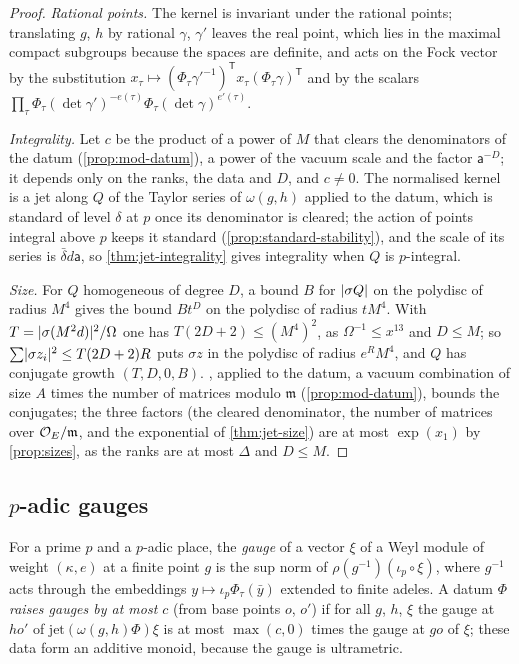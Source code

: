 \begin{proof}
\emph{Rational points.} The kernel is invariant under the rational points; translating $g$, $h$ by rational $\gamma$, $\gamma'$ leaves the real point, which lies in the maximal compact subgroups because the spaces are definite, and acts on the Fock vector by the substitution $x_\tau\mapsto(\Phi_\tau\gamma'^{-1})^{\mathsf T}x_\tau(\Phi_\tau\gamma)^{\mathsf T}$ and by
the scalars $\prod_\tau\Phi_\tau(\det\gamma')^{-e(\tau)}\Phi_\tau(\det\gamma)^{e'(\tau)}$.

\emph{Integrality.} Let $c$ be the product of a power of $M$ that clears the denominators of the datum (\cref{prop:mod-datum}), a power of the vacuum scale and the factor $\mathsf a^{-D}$; it depends only on the ranks, the data and $D$, and $c\ne0$. The normalised kernel is a jet along $Q$ of the Taylor series of $\omega(g,h)$ applied to the
datum, which is standard of level $\delta$ at $p$ once its denominator is cleared; the action of points integral above $p$ keeps it standard (\cref{prop:standard-stability}), and the scale of its series is $\bar\delta d\mathsf a$, so \cref{thm:jet-integrality} gives integrality when $Q$ is $p$-integral.

\emph{Size.} For $Q$ homogeneous of degree $D$, a bound $B$ for $\lvert \sigma Q\rvert$ on the polydisc of radius $M^4$ gives the bound $Bt^D$ on the polydisc of radius $tM^4$. With $T=\lvert \sigma(M^2d)\rvert^2/\Omega$ one has $T(2D+2)\le(M^4)^2$, as $\Omega^{-1}\le x^{13}$ and $D\le M$; so $\sum\lvert \sigma z_i\rvert^2\le T(2D+2)R$ puts $\sigma z$ in the polydisc of
radius $e^RM^4$, and $Q$ has conjugate growth $(T,D,0,B)$. , applied to the datum, a vacuum combination of size $A$ times the number of matrices modulo $\mathfrak m$ (\cref{prop:mod-datum}), bounds the conjugates; the three factors (the cleared denominator, the number of matrices over $\mathcal{O}_E/\mathfrak m$, and the
exponential of \cref{thm:jet-size}) are at most $\exp(x_1)$ by \cref{prop:sizes}, as the ranks are at most $\Delta$ and $D\le M$.
\end{proof}

\subsection{\texorpdfstring{$p$}{p}-adic gauges}\label{ss:gauges}
For a prime $p$ and a $p$-adic place, the \emph{gauge} of a vector $\xi$ of a Weyl module of weight $(\kappa,e)$ at a finite point
$g$ is the sup norm of $\rho(g^{-1})(\iota_p\circ\xi)$, where $g^{-1}$ acts through the embeddings $y\mapsto\iota_p\Phi_\tau(\bar y)$
extended to finite adeles. A datum $\Phi$ \emph{raises gauges by at most $c$} (from base points $o$, $o'$) if for all $g$, $h$, $\xi$
the gauge at $ho'$ of $\mathrm{jet}(\omega(g,h)\Phi)\xi$ is at most $\max(c,0)$ times the gauge at $go$ of $\xi$; these data form an
additive monoid, because the gauge is ultrametric.

